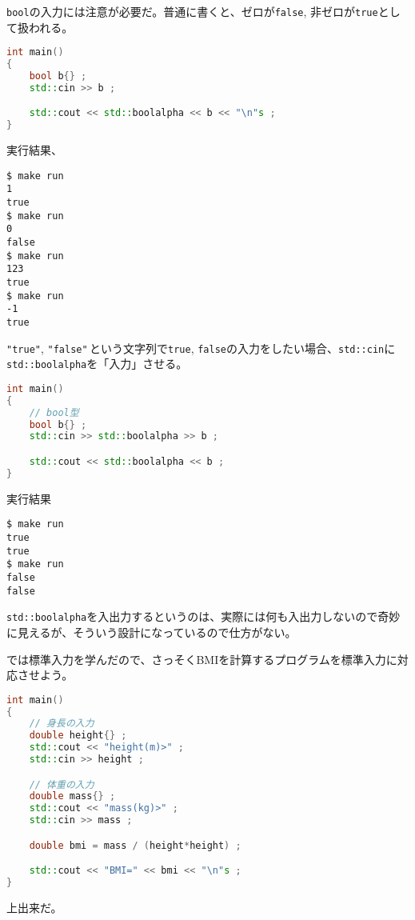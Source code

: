 \texttt{bool}の入力には注意が必要だ。普通に書くと、ゼロが\texttt{false}, 非ゼロが\texttt{true}として扱われる。

\begin{lstlisting}[language={C++}]
int main()
{
    bool b{} ;
    std::cin >> b ;

    std::cout << std::boolalpha << b << "\n"s ;
}
\end{lstlisting}

実行結果、

\begin{lstlisting}[style=terminal]
$ make run
1
true
$ make run
0
false
$ make run
123
true
$ make run
-1
true
\end{lstlisting}

\texttt{"true"}, \texttt{"false"}\,という文字列で\texttt{true}, \texttt{false}の入力をしたい場合、\texttt{std::cin}に\texttt{std::boolalpha}を「入力」させる。

\begin{lstlisting}[language={C++}]
int main()
{
    // bool型
    bool b{} ;
    std::cin >> std::boolalpha >> b ;

    std::cout << std::boolalpha << b ;
}
\end{lstlisting}

\ifTombow\pagebreak\fi
実行結果

\begin{lstlisting}[style=terminal]
$ make run
true
true
$ make run
false
false
\end{lstlisting}

\texttt{std::boolalpha}を入出力するというのは、実際には何も入出力しないので奇妙に見えるが、そういう設計になっているので仕方がない。

では標準入力を学んだので、さっそくBMIを計算するプログラムを標準入力に対応させよう。

\begin{lstlisting}[language={C++}]
int main()
{
    // 身長の入力
    double height{} ;
    std::cout << "height(m)>" ;
    std::cin >> height ;

    // 体重の入力
    double mass{} ;
    std::cout << "mass(kg)>" ;
    std::cin >> mass ;

    double bmi = mass / (height*height) ;

    std::cout << "BMI=" << bmi << "\n"s ;
}
\end{lstlisting}

上出来だ。


